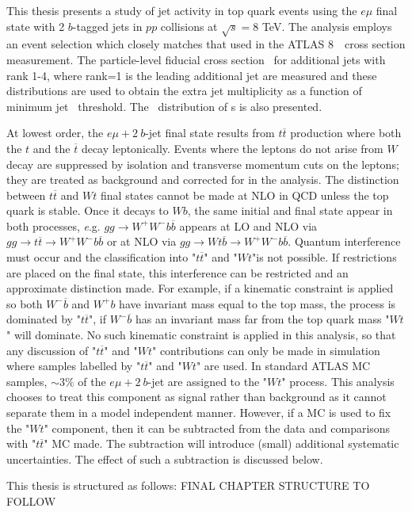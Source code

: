 This thesis presents a study of jet activity in top quark events using the $e\mu$ final state 
with 2 $b$-tagged jets in $pp$ collisions at $\sqrt{s}=8$ TeV. The analysis employs
an event selection which closely matches that used in the ATLAS 8~\TeV\ cross
section measurement\cite{xsec}.
The particle-level fiducial cross section \sigmapti\ for additional jets with 
rank 1-4, where rank=1  is the leading additional jet are measured and
these distributions are used to obtain the extra jet multiplicity as a function of minimum jet \pt\ threshold. 
The \pt\ distribution of \bjet s is also presented.

At lowest order, the $e\mu+2\ b$-jet final state results from $t\overline t$ production where both the 
$t$ and the $\overline t$  decay leptonically.  
Events where the leptons do not arise from $W$ decay are suppressed by isolation and
transverse momentum cuts on the leptons; they are treated as background and corrected for in the analysis.
The distinction between $t\overline{t}$ and $Wt$ final states cannot be made at NLO in QCD unless the top quark is stable.
Once it decays to $Wb$, the same initial and final state appear in both processes,
{\textit e.g.} $gg\to W^+W^- b \overline{b}$ appears at LO and NLO via $gg\to  t\overline{t}\to W^+W^- b \overline{b}$ or
at NLO via  $gg\to  Wt\overline{b} \to W^+W^- b \overline{b}$.
Quantum interference must occur and the classification into
"$t\overline{t}$" and "$Wt$"is not possible. If restrictions are placed on the final state,
 this interference can be restricted and an approximate distinction made. For example,
if a kinematic constraint is applied so both  $W^-\overline{b}$ and  $W^+ b$
have invariant mass equal to the top mass, 
the process is dominated by "$t\overline{t}$", if  $W^-\overline{b}$ has an invariant mass
far from the top quark mass "$Wt$" will dominate.
No such kinematic constraint is applied in this analysis, so that any discussion of  "$t\overline{t}$" 
and "$Wt$" contributions can only be made in simulation where samples labelled by 
 "$t\overline{t}$" and "$Wt$" are used.  In standard ATLAS MC samples, $\sim 3\%$ of the 
$e\mu+2\ b$-jet are assigned to the "$Wt$" process.  This analysis chooses to treat this
component as signal rather than background as it cannot separate them in a model independent manner. However, if a MC is used to fix the
 "$Wt$" component, then it can be subtracted from the data and comparisons with "$t\overline{t}$" MC made. The subtraction will 
introduce (small) additional systematic uncertainties. The effect of such a subtraction is discussed below.

This thesis is structured as follows: FINAL CHAPTER STRUCTURE TO FOLLOW
